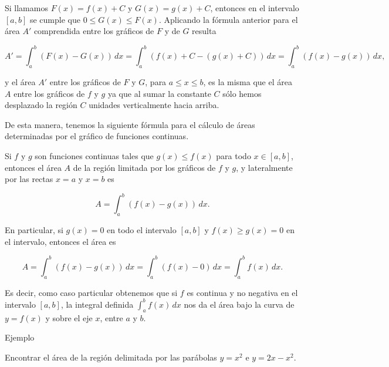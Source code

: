 \documentclass[
  letterpaper,
]{book}
\theoremstyle{plain}
\theoremstyle{remark}
\begin{document}
Si llamamos \(F(x)=f(x)+C\) y \(G(x)=g(x)+C\), entonces en el intervalo
\([a,b]\) se cumple que \(0\leq G(x)\leq F(x)\). Aplicando la fórmula
anterior para el área \(A'\) comprendida entre los gráficos de \(F\) y
de \(G\) resulta

\[
A'=\int_a^b (F(x)-G(x))\,dx=\int_a^b (f(x)+C-(g(x)+C))\,dx=\int_a^b (f(x)-g(x))\,dx,
\]

y el área \(A'\) entre los gráficos de \(F\) y \(G\), para
\(a\leq x\leq b\), es la misma que el área \(A\) entre los gráficos de
\(f\) y \(g\) ya que al sumar la constante \(C\) sólo hemos desplazado
la región \(C\) unidades verticalmente hacia arriba.

De esta manera, tenemos la siguiente fórmula para el cálculo de áreas
determinadas por el gráfico de funciones continuas.

Si \(f\) y \(g\) son funciones continuas tales que \(g(x)\leq f(x)\)
para todo \(x\in [a,b]\), entonces el área \(A\) de la región limitada
por los gráficos de \(f\) y \(g\), y lateralmente por las rectas \(x=a\)
y \(x=b\) es

\[
A=\int_a^b (f(x)-g(x))\,dx.
\]

En particular, si \(g(x)=0\) en todo el intervalo \([a,b]\) y
\(f(x)\geq g(x)=0\) en el intervalo, entonces el área es

\[
A=\int_a^b (f(x)-g(x))\,dx=\int_a^b (f(x)-0)\,dx=\int_a^b f(x)\,dx.
\]

Es decir, como caso particular obtenemos que si \(f\) es continua y no
negativa en el intervalo \([a,b]\), la integral definida
\(\int_a^b f(x)\,dx\) nos da el área bajo la curva de \(y=f(x)\) y sobre
el eje \(x\), entre \(a\) y \(b\).

Ejemplo

Encontrar el área de la región delimitada por las parábolas \(y=x^2\) e
\(y=2x-x^2\).
\end{document}
